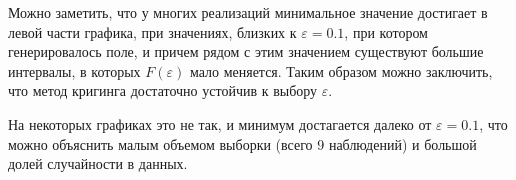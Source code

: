 \documentclass[a4paper, 12pt, onepage]{article}
\begin{document}
Можно заметить, что у многих реализаций минимальное значение достигает в левой части графика,
при значениях, близких к $\varepsilon = 0.1$, при котором генерировалось поле,
и причем рядом с этим значением существуют большие интервалы, в которых $F(\varepsilon)$
мало меняется. Таким образом можно заключить, что метод кригинга достаточно устойчив
к выбору $\varepsilon$.

На некоторых графиках это не так, и минимум достагается далеко от $\varepsilon=0.1$,
что можно объяснить малым объемом выборки (всего 9 наблюдений) и большой долей
случайности в данных.
\end{document}
